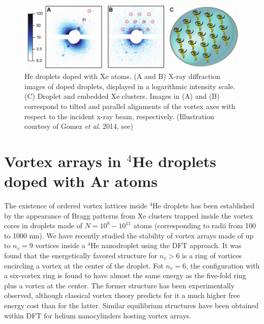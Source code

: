 		\begin{figure}[t]
			\begin{center}
				\includegraphics[width=\textwidth]{vortex-array}
				\caption{He droplets doped with Xe atoms. (A and B) X-ray diffraction images of doped droplets, displayed in a logarithmic intensity scale. (C) Droplet and embedded Xe clusters. Images in (A) and (B) correspond to tilted and parallel alignments of the vortex axes with respect to the incident x-ray beam, respectively. (Illustration courtesy of Gomez \emph{et al}. 2014, see)}
				\label{fig:vortex-array}
			\end{center}
		\end{figure}
		
	\section{Vortex arrays in $^4$He droplets doped with Ar atoms}
		The existence of ordered vortex lattices inside $^4$He droplets has been established  by the appearance of Bragg patterns from 
		Xe clusters trapped inside the vortex cores  in droplets made of $N= 10^8 - 10^{11}$ atoms
		(corresponding to radii from 100 to 1000 nm)\citep{Gom14,Jones2016}. We have 
		recently studied the stability of vortex 
		arrays made of up to $n_v=9$ vortices
		inside a $^4$He nanodroplet using the DFT approach\citep{Anc15}.  
		It was found that 
		the energetically favored structure for $n_v > 6$ is a ring 
		of vortices encircling a vortex at the center of the droplet.
		Fot $n_v=6$,  the 
		configuration with a six-vortex ring is found to have almost 
		the same energy as the five-fold ring
		plus a vortex at the center. The former structure 
		has been experimentally observed\citep{Gom14,Jones2016,Ber17}, 
		although classical vortex theory 
		predicts for it a much higher free energy cost than for the latter\citep{Cam79}.
		Similar equilibrium structures have been obtained within DFT for
		helium nanocylinders hosting vortex arrays\citep{Anc14}.
		
